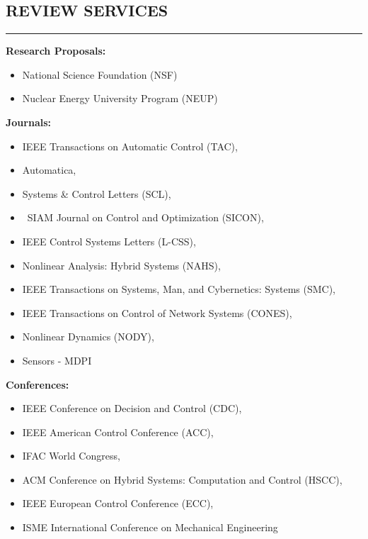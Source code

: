 \documentclass{article}
\begin{document}
\vspace{-9pt}

\subsection*{REVIEW SERVICES}
\vspace{-2pt}
\hrule
\vspace{10pt}

\hspace{\parindent}\textbf{Research Proposals:}
\begin{itemize}
\setlength\itemsep{-2 pt}
\item National Science Foundation (NSF)
\item Nuclear Energy University Program (NEUP)

\end{itemize}


\textbf{Journals:}
\begin{itemize}
\setlength\itemsep{-2 pt}
\item IEEE Transactions on Automatic Control (TAC), \item Automatica, \item Systems \& Control Letters (SCL), \item~SIAM Journal on Control and Optimization (SICON), \item IEEE Control Systems Letters (L-CSS), \item Nonlinear Analysis: Hybrid Systems (NAHS), \item IEEE Transactions on Systems, Man, and Cybernetics: Systems (SMC), \item IEEE Transactions on Control of Network Systems (CONES), \item Nonlinear Dynamics (NODY), \item Sensors - MDPI

\end{itemize}


\textbf{Conferences:}
\begin{itemize}
\setlength\itemsep{-2 pt}
\item IEEE Conference on Decision and Control (CDC), \item IEEE American Control Conference (ACC), \item IFAC World Congress, \item ACM Conference on Hybrid Systems: Computation and Control (HSCC), \item IEEE European Control Conference (ECC), \item ISME International Conference on Mechanical Engineering
\end{itemize}
\end{document}
